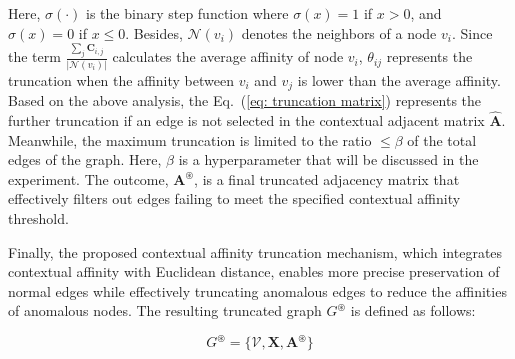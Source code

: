 \documentclass{article}
\begin{document}
Here, $ \sigma(\cdot) $ is the binary step function where $\sigma(x) = 1 $ if $ x > 0 $, and $ \sigma(x) = 0 $ if $ x \leq 0 $. Besides, $\mathcal{N}(v_i)$ denotes the neighbors of a node $v_i$. Since the term
$\frac{\sum_j \mathbf{C}_{i,j}}{|\mathcal{N}(v_i)|} $ calculates the average affinity of node $v_i$, $\theta_{ij}$ represents the truncation when the affinity between $v_i$ and $v_j$ is lower than the average affinity. Based on the above analysis, the Eq.~(\ref{eq: truncation matrix}) represents the further truncation if an edge is not selected in the contextual adjacent matrix $\hat{\mathbf{A}}$.
Meanwhile, the maximum truncation is limited to the ratio $\leq \beta$ of the total edges of the graph.
Here, $\beta$ is a hyperparameter that will be discussed in the experiment.
The outcome, $\mathbf{A}^{\circledast}$, is a final truncated adjacency matrix that effectively filters out edges failing to meet the specified contextual affinity threshold.


Finally, the proposed contextual affinity truncation mechanism, which integrates contextual affinity with Euclidean distance, enables more precise preservation of normal edges while effectively truncating anomalous edges to reduce the affinities of anomalous nodes. The resulting truncated graph ${G}^{\circledast}$ is defined as follows:

\begin{equation}
G^{\circledast} = \{\mathcal{V}, \mathbf{X}, \mathbf{A}^{\circledast}\}
\label{eq: Truncated graph}
\end{equation}


\end{document}
